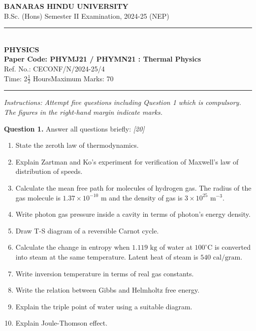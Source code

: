 \documentclass[11pt,a4paper]{article}
\newcommand{\pts}[1]{\hfill \textit{[#1]}}
\begin{document}
\begin{center}
  {\large\bfseries BANARAS HINDU UNIVERSITY}\\[2pt]
  {\normalsize B.Sc. (Hons) Semester II Examination, 2024-25 (NEP)}\\[6pt]
  \rule{0.8\linewidth}{0.5pt}\\[6pt]
  {\large\bfseries PHYSICS}\\[4pt]
  {\large\bfseries Paper Code: PHYMJ21 / PHYMN21 : Thermal Physics}\\[2pt]
  {\small Ref. No.: CECONF/N/2024-25/4}\\[4pt]
  {\normalsize Time: 2$\frac{1}{2}$ Hours\hfill Maximum Marks: 70}
\end{center}

\rule{\linewidth}{0.4pt}

\smallskip

\noindent \textit{Instructions: Attempt five questions including Question 1 which is compulsory. The figures in the right-hand margin indicate marks.}

\bigskip

\noindent \textbf{Question 1.} Answer all questions briefly: \pts{20}
\begin{enumerate}[label=(\alph*)]
  \item State the zeroth law of thermodynamics.
  \item Explain Zartman and Ko's experiment for verification of Maxwell's law of distribution of speeds.
  \item Calculate the mean free path for molecules of hydrogen gas. The radius of the gas molecule is $1.37 \times 10^{-10}\text{ m}$ and the density of gas is $3 \times 10^{25}\text{ m}^{-3}$.
  \item Write photon gas pressure inside a cavity in terms of photon's energy density.
  \item Draw T-S diagram of a reversible Carnot cycle.
  \item Calculate the change in entropy when $1.119\text{ kg}$ of water at $100^\circ\text{C}$ is converted into steam at the same temperature. Latent heat of steam is $540\text{ cal/gram}$.
  \item Write inversion temperature in terms of real gas constants.
  \item Write the relation between Gibbs and Helmholtz free energy.
  \item Explain the triple point of water using a suitable diagram.
  \item Explain Joule-Thomson effect.
\end{enumerate}
\end{document}
